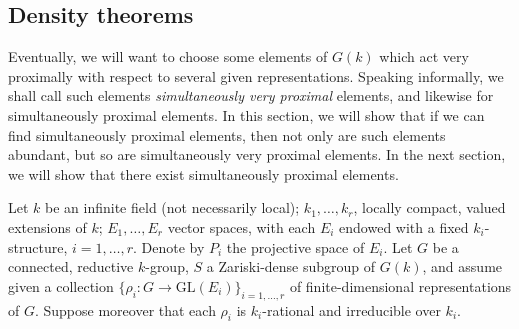 \documentclass{amsart}
\theoremstyle{plain}
\theoremstyle{definition}
\theoremstyle{remark}
\begin{document}
\subsection{Density theorems}
Eventually, we will want to choose some elements of $G(k)$ which act very proximally
with respect to several given representations. Speaking informally, we shall call such
elements \emph{simultaneously very proximal} elements, and likewise for simultaneously
proximal elements. In this section, we will show that if we
can find simultaneously proximal elements, then not only are such elements abundant, but
so are simultaneously very proximal elements. In the next section, we will show that
there exist simultaneously proximal elements.

Let $k$ be an infinite field (not
necessarily local); $k_{1},\ldots, k_{r}$, locally compact, valued extensions of $k$; 
$E_{1},\ldots, E_{r}$ vector spaces, with each $E_{i}$ endowed
with a fixed $k_{i}$-structure, $i = 1,\ldots, r$. Denote by $P_{i}$ the projective
space of $E_{i}$. Let
$G$ be a connected, reductive $k$-group, $S$ a Zariski-dense subgroup of $G(k)$, and
assume given a collection $\{\rho_{i}: G \to \mathrm{GL}(E_{i})\}_{i = 1,\ldots, r}$ of 
finite-dimensional representations of $G$. Suppose moreover that
each $\rho_{i}$ is $k_{i}$-rational and irreducible over $k_{i}$.
\end{document}
